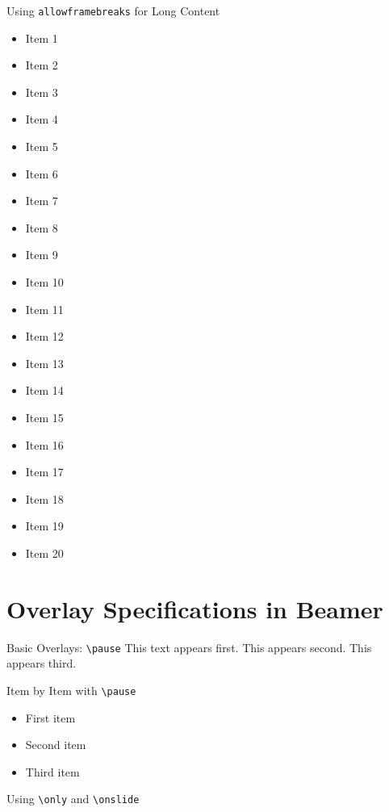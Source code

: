 \documentclass[aspectratio=43]{beamer}
\begin{document}
\begin{frame}[allowframebreaks]{Using \texttt{allowframebreaks} for Long Content}
    \begin{itemize}
        \item Item 1
        \item Item 2
        \item Item 3
        \item Item 4
        \item Item 5
        \item Item 6
        \item Item 7
        \item Item 8
        \item Item 9
        \item Item 10
        \item Item 11
        \item Item 12
        \item Item 13
        \item Item 14
        \item Item 15
        \item Item 16
        \item Item 17
        \item Item 18
        \item Item 19
        \item Item 20
    \end{itemize}
\end{frame}

\section{Overlay Specifications in Beamer}

\begin{frame}{Basic Overlays: \texttt{\textbackslash pause}}
This text appears first.
\pause
This appears second.
\pause
This appears third.
\end{frame}

\begin{frame}{Item by Item with \texttt{\textbackslash pause}}
\begin{itemize}
    \item First item \pause
    \item Second item \pause
    \item Third item
\end{itemize}
\end{frame}

\begin{frame}{Using \texttt{\textbackslash only} and \texttt{\textbackslash onslide}}
\end{frame}
\end{document}

